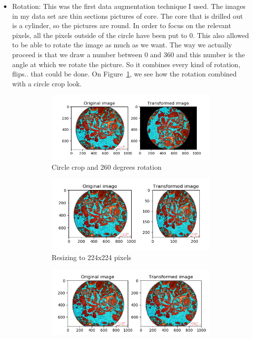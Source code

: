 \begin{itemize}
    \item Rotation: This was the first data augmentation technique I used. The images in my data set are thin sections pictures of core. The core that is drilled out is a cylinder, so the pictures are round. In order to focus on the relevant pixels, all the pixels outside of the circle have been put to 0. This also allowed to be able to rotate the image as much as we want. The way we actually proceed is that we draw a number between 0 and 360 and this number is the angle at which we rotate the picture. So it combines every kind of rotation, flips.. that could be done. On Figure~\ref{fig:rotate}, we see how the rotation combined with a circle crop look.
\begin{figure}
\begin{subfigure}{.5\textwidth}
  \centering
  \includegraphics[width=.8\linewidth]{figures/03-rotation_260}
  \caption{Circle crop and 260 degrees rotation}
  \label{fig:rotate}
\end{subfigure}%
\begin{subfigure}{.5\textwidth}
  \centering
  \includegraphics[width=.8\linewidth]{figures/03-resize.PNG}
  \caption{Resizing to 224x224 pixels}
  \label{fig:resize}
\end{subfigure}
\begin{subfigure}{.5\textwidth}
  \centering
  \includegraphics[width=.8\linewidth]{figures/03-elastic_trans_08_03.PNG}

\end{subfigure}
\end{figure}
\end{itemize}
